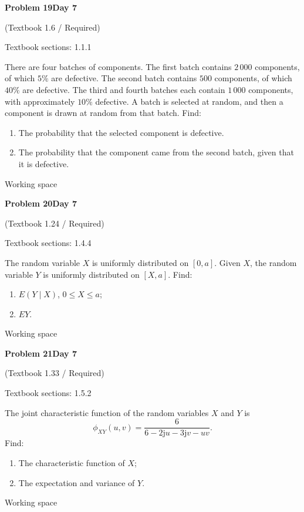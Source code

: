\documentclass[11pt]{article}
\newcommand{\qtitle}[2]{\clearpage\begin{tcolorbox}[colback=navy,colframe=navy,arc=1.5pt,boxrule=0pt]\color{white}\large\bfseries #1\hfill\small #2\end{tcolorbox}}
\begin{document}
\qtitle{Problem 19}{Day 7}
{\small\color{accentred}(Textbook 1.6 / Required)}\par\smallskip
{\small\color{muted}Textbook sections: 1.1.1}\par\medskip
\begin{tcolorbox}[colback=qbg,colframe=qbg,boxrule=0pt]There are four batches of components. The first batch contains $2\,000$ components, of which $5\%$ are defective. The second batch contains $500$ components, of which $40\%$ are defective. The third and fourth batches each contain $1\,000$ components, with approximately $10\%$ defective. A batch is selected at random, and then a component is drawn at random from that batch. Find:
\begin{enumerate}
\item The probability that the selected component is defective.
\item The probability that the component came from the second batch, given that it is defective.
\end{enumerate}\end{tcolorbox}\smallskip\begin{workspace}\hfill{\color{linec}\footnotesize Working space}\end{workspace}
\qtitle{Problem 20}{Day 7}
{\small\color{accentred}(Textbook 1.24 / Required)}\par\smallskip
{\small\color{muted}Textbook sections: 1.4.4}\par\medskip
\begin{tcolorbox}[colback=qbg,colframe=qbg,boxrule=0pt]The random variable $X$ is uniformly distributed on $[0,a]$. Given $X$, the random variable $Y$ is uniformly distributed on $[X,a]$. Find:
\begin{enumerate}
\item $E(Y\mid X)$, $0\leq X\leq a$;
\item $EY$.
\end{enumerate}\end{tcolorbox}\smallskip\begin{workspace}\hfill{\color{linec}\footnotesize Working space}\end{workspace}
\qtitle{Problem 21}{Day 7}
{\small\color{accentred}(Textbook 1.33 / Required)}\par\smallskip
{\small\color{muted}Textbook sections: 1.5.2}\par\medskip
\begin{tcolorbox}[colback=qbg,colframe=qbg,boxrule=0pt]The joint characteristic function of the random variables $X$ and $Y$ is
\[
\phi_{XY}(u,v)=\frac{6}{6-2\mathrm{j}u-3\mathrm{j}v-uv}.
\]
Find:
\begin{enumerate}
\item The characteristic function of $X$;
\item The expectation and variance of $Y$.
\end{enumerate}\end{tcolorbox}\smallskip\begin{workspace}\hfill{\color{linec}\footnotesize Working space}\end{workspace}
\end{document}
